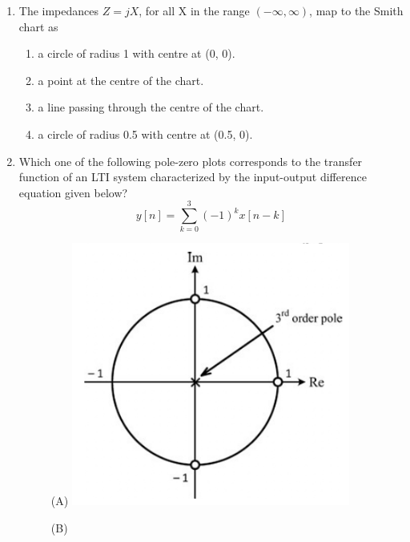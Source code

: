 \documentclass[a4paper, 11pt]{article}
\begin{document}
\begin{enumerate}
    \hfill{}

    \item The impedances $Z=jX$, for all X in the range $(-\infty, \infty)$, map to the Smith chart as
    \begin{enumerate}
        \item a circle of radius 1 with centre at (0, 0).
        \item a point at the centre of the chart.
        \item a line passing through the centre of the chart.
        \item a circle of radius 0.5 with centre at (0.5, 0).
    \end{enumerate}

    \hfill{}

    \item Which one of the following pole-zero plots corresponds to the transfer function of an LTI system characterized by the input-output difference equation given below?
    $$y[n] = \sum_{k=0}^{3}(-1)^k x[n-k]$$
    \begin{figure}[H]
        \centering
        \begin{minipage}{0.45\textwidth}
            \centering
            (A)
            \includegraphics[width=0.8\linewidth]{figs/Q14A.png}
            \label{fig:q24a}
        \end{minipage}
        \begin{minipage}{0.45\textwidth}
            \centering
            (B)

\end{minipage}
\end{figure}
\end{enumerate}
\end{document}
